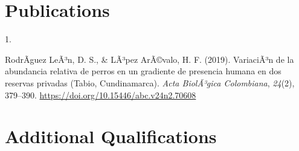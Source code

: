 \documentclass[10pt,a4paper,]{twentysecondcv}
\newlength{\csllabelwidth}
\newcommand{\CSLLeftMargin}[1]{\parbox[t]{\csllabelwidth}{#1}}
\newcommand{\CSLRightInline}[1]{\parbox[t]{\linewidth - \csllabelwidth}{#1}}
\begin{document}
\hypertarget{publications}{%
\section{Publications}\label{publications}}

\hypertarget{bibliography}{}
\leavevmode\hypertarget{ref-RodriguezLeon2019}{}%
\CSLLeftMargin{1. }
\CSLRightInline{RodrÃ­guez LeÃ³n, D. S., \& LÃ³pez ArÃ©valo, H. F.
(2019). VariaciÃ³n de la abundancia relativa de perros en un gradiente
de presencia humana en dos reservas privadas (Tabio, Cundinamarca).
\emph{Acta BiolÃ³gica Colombiana}, \emph{24}(2), 379--390.
\url{https://doi.org/10.15446/abc.v24n2.70608}}

\hypertarget{additional-qualifications}{%
\section{Additional Qualifications}\label{additional-qualifications}}

\nopagebreak

\begin{twentyshort}
\end{twentyshort}
\end{document}
